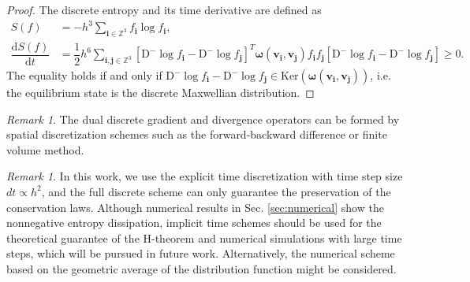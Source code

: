 \documentclass[preprint,1p,times]{elsarticle}
\theoremstyle{definition}
\theoremstyle{remark}
\newtheorem{remark}[theorem]{Remark}
\newcommand{\tcr}[1]{\textcolor{black}{#1}}
\begin{document}
\begin{proof}
The discrete entropy and its time derivative are defined as
\begin{equation}
    \begin{aligned}
        S(f) &= - h^{3} \sum_{\boldsymbol{i}\in\mathbb{Z}^{3}} f_{\boldsymbol{i}} \log f_{\boldsymbol{i}} , \\
        \dfrac{\mathrm{d} S(f)}{\mathrm{d} t} &= \dfrac{1}{2} h^{6} \sum_{\boldsymbol{i},\boldsymbol{j}\in\mathbb{Z}^{3}} \left[ \mathrm{D}^{-} \log f_{\boldsymbol{i}} - \mathrm{D}^{-} \log f_{\boldsymbol{j}} \right]^{T} \boldsymbol{\omega}(\boldsymbol{v}_{\boldsymbol{i}},\boldsymbol{v}_{\boldsymbol{j}}) f_{\boldsymbol{i}} f_{\boldsymbol{j}} \left[ \mathrm{D}^{-} \log f_{\boldsymbol{i}} - \mathrm{D}^{-} \log f_{\boldsymbol{j}} \right] \geq 0.
    \end{aligned}
\end{equation}
%
The equality holds if and only if $\mathrm{D}^{-} \log f_{\boldsymbol{i}} - \mathrm{D}^{-} \log f_{\boldsymbol{j}} \in \text{Ker}(\boldsymbol{\omega}(\boldsymbol{v}_{\boldsymbol{i}},\boldsymbol{v}_{\boldsymbol{j}}))$, i.e. the equilibrium state is the discrete Maxwellian distribution.
\end{proof}



\begin{remark}
The dual discrete gradient and divergence operators can be formed by spatial discretization schemes such as the forward-backward difference or finite volume method.    
\end{remark}


\begin{remark}
In this work, we use the explicit time discretization with time step size $dt \propto h^{2}$, and the full discrete scheme can only guarantee the preservation of the conservation laws. Although numerical results in Sec. \ref{sec:numerical} show the nonnegative entropy dissipation, implicit time schemes should be used for the theoretical guarantee of the H-theorem and numerical simulations with large time steps, which will be pursued in future work. Alternatively, the numerical scheme \cite{buet1999numerical} based on the geometric average of the distribution function might be considered.       
\end{remark}

\end{document}
